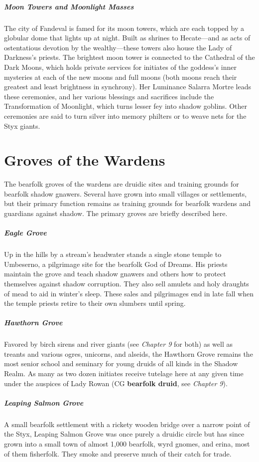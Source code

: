 \documentclass[10pt,a4paper,twoside,bg=print,twocolumn,openany,nodeprecatedcode]{dndbook}
\begin{document}
\subparagraph{Moon Towers and Moonlight Masses}
The city of Fandeval is famed for its moon towers, which are each topped by a globular dome that lights up at night. Built as shrines to Hecate—and as acts of ostentatious devotion by the wealthy—these towers also house the Lady of Darkness's priests. The brightest moon tower is connected to the Cathedral of the Dark Moons, which holds private services for initiates of the goddess's inner mysteries at each of the new moons and full moons (both moons reach their greatest and least brightness in synchrony). Her Luminance Salarra Mortre leads these ceremonies, and her various blessings and sacrifices include the Transformation of Moonlight, which turns lesser fey into shadow goblins. Other ceremonies are said to turn silver into memory philters or to weave nets for the Styx giants.

\section{Groves of the Wardens}
The bearfolk groves of the wardens are druidic sites and training grounds for bearfolk shadow gnawers. Several have grown into small villages or settlements, but their primary function remains as training grounds for bearfolk wardens and guardians against shadow. The primary groves are briefly described here.

\subparagraph{Eagle Grove}
Up in the hills by a stream's headwater stands a single stone temple to Umbeserno, a pilgrimage site for the bearfolk God of Dreams. His priests maintain the grove and teach shadow gnawers and others how to protect themselves against shadow corruption. They also sell amulets and holy draughts of mead to aid in winter's sleep. These sales and pilgrimages end in late fall when the temple priests retire to their own slumbers until spring.

\subparagraph{Hawthorn Grove}
Favored by birch sirens and river giants (see \textit{Chapter 9} for both) as well as treants and various ogres, unicorns, and alseids, the Hawthorn Grove remains the most senior school and seminary for young druids of all kinds in the Shadow Realm. As many as two dozen initiates receive tutelage here at any given time under the auspices of Lady Rowan (CG \textbf{bearfolk druid}, see \textit{Chapter 9}).

\subparagraph{Leaping Salmon Grove}
A small bearfolk settlement with a rickety wooden bridge over a narrow point of the Styx, Leaping Salmon Grove was once purely a druidic circle but has since grown into a small town of almost 1,000 bearfolk, wyrd gnomes, and erina, most of them fisherfolk. They smoke and preserve much of their catch for trade.
\end{document}
